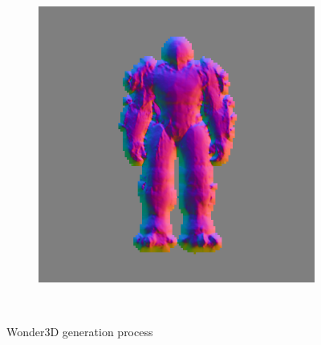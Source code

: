 \begin{figure}[ht]
\begin{subfigure}[b]{0.18\textwidth}
        \includegraphics[width=\textwidth]{etc/a robot made out of plants/wonder3d/test/wonder3D_10000_front_part4}
        \caption{}
    \end{subfigure}
    \caption{Wonder3D generation process}~\label{fig:generationWonder3D}
  \end{figure}
